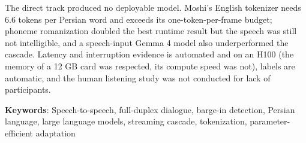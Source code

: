 The direct track produced no deployable model. Moshi's English tokenizer needs
6.6 tokens per Persian word and exceeds its one-token-per-frame budget;
phoneme romanization doubled the best runtime result but the speech was still
not intelligible, and a speech-input Gemma 4 model also underperformed the
cascade. Latency and interruption evidence is automated and on an H100 (the
memory of a 12 GB card was respected, its compute speed was not), labels are
automatic, and the human listening study was not conducted for lack of participants.

\bigskip\noindent\textbf{Keywords}:
Speech-to-speech, full-duplex dialogue, barge-in detection, Persian language,
large language models, streaming cascade, tokenization, parameter-efficient adaptation
\endgroup
\newpage
